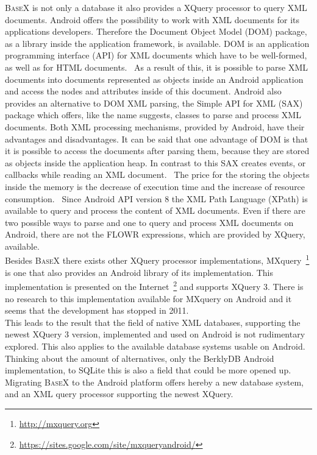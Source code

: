\textsc{BaseX} is not only a database it also provides a XQuery processor to query XML documents.
Android offers the possibility to work with XML documents for its applications developers.
Therefore the Document Object Model (DOM) package, as a library inside the application framework, is available.
DOM is an application programming interface (API) for XML documents which have to be well-formed, as well as for HTML documents.~\cite{nicol2001document}
As a result of this, it is possible to parse XML documents into documents represented as objects inside an Android application and access the nodes and attributes inside of this document.
Android also provides an alternative to DOM XML parsing, the Simple API for XML (SAX) package which offers, like the name suggests, classes to parse and process XML documents.
Both XML processing mechanisms, provided by Android, have their advantages and disadvantages.
It can be said that one advantage of DOM is that it is possible to access the documents after parsing them, because they are stored as objects inside the application heap.
In contrast to this SAX creates events, or callbacks while reading an XML document.~\cite{roy2001xml}
The price for the storing the objects inside the memory is the decrease of execution time and the increase of resource consumption.~\cite{chenextracting}
Since Android API version 8 the XML Path Language (XPath) is available to query and process the content of XML documents.
Even if there are two possible ways to parse and one to query and process XML documents on Android, there are not the FLOWR expressions, which are provided by XQuery, available.\\
Besides \textsc{BaseX} there exists other XQuery processor implementations, MXquery~\footnote{\url{http://mxquery.org}} is one that also provides an Android library of its implementation.
This implementation is presented on the Internet~\footnote{\url{https://sites.google.com/site/mxqueryandroid/}} and supports XQuery 3.
There is no research to this implementation available for MXquery on Android and it seems that the development has stopped in 2011.\\
This leads to the result that the field of native XML databases, supporting the newest XQuery 3 version, implemented and used on Android is not rudimentary explored.
This also applies to the available database systems usable on Android.
Thinking about the amount of alternatives, only the BerklyDB Android implementation, to SQLite this is also a field that could be more opened up.
Migrating \textsc{BaseX} to the Android platform offers hereby a new database system, and an XML query processor supporting the newest XQuery.

